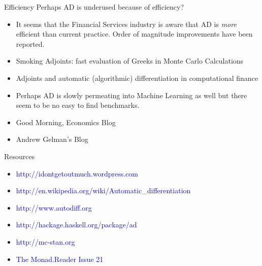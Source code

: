 \documentclass{beamer}
\begin{document}
\begin{frame}[fragile]{Efficiency}
Perhaps AD is underused because of efficiency?

\begin{itemize}
\pause
\item
It seems that the Financial Services industry is aware that AD is {\em
  more} efficient than current practice. Order of magnitude
improvements have been reported.
\pause
\item
Smoking Adjoints: fast evaluation of Greeks in Monte Carlo Calculations
\pause
\item
Adjoints and automatic (algorithmic) differentiation in computational finance
\pause
\item
Perhaps AD is slowly permeating into Machine Learning as well but
there seem to be no easy to find benchmarks.
\pause
\item
Good Morning, Economics Blog
\pause
\item
Andrew Gelman's Blog
\end{itemize}
\end{frame}

\begin{frame}[fragile]{Resources}
\begin{itemize}
\item \textcolor{blue}{http://idontgetoutmuch.wordpress.com}
\item
  \textcolor{blue}{http://en.wikipedia.org/wiki/Automatic\_differentiation}
\item \textcolor{blue}{http://www.autodiff.org}
\item \textcolor{blue}{http://hackage.haskell.org/package/ad}
\item \textcolor{blue}{http://mc-stan.org}
\item \textcolor{blue}{The Monad.Reader Issue 21}
\end{itemize}
\end{frame}
\end{document}

